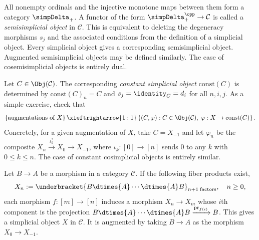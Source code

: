 \begin{remark}\label{rem:semisimplicial}
	All nonempty ordinals and the injective monotone maps between them form a
	category $\simpDelta_+$. A functor of the form
	$\simpDelta_+^{\opp}\to\mathcal{C}$ is called a \emph{semisimplicial
	object} in $\mathcal{C}$. This is equivalent to deleting the degeneracy
	morphisms $s_j$ and the associated conditions from the definition of a
	simplicial object. Every simplicial object gives a corresponding
	semisimplicial object. Augmented semisimplicial objects may be defined
	similarly. The case of cosemisimplicial objects is entirely dual.
\end{remark}

\begin{example}\label{eg:const-simplicial}
	Let $C\in\Obj(\mathcal{C})$. The corresponding \emph{constant simplicial
	object} $\mathrm{const}(C)$ is determined by
	$\mathrm{const}(C)_n=C$ and $s_j=\identity_C=d_i$ for all $n,i,j$. As a
	simple exercise, check that
	\[ \left\{ \text{augmentations of }X\right\} \xleftrightarrow{1:1} \left\{ (C, \varphi): C \in \Obj(\mathcal{C}), \; \varphi: X \to \mathrm{const}(C)  \right\}. \]
	Concretely, for a given augmentation of $X$, take $C=X_{-1}$ and let
	$\varphi_n$ be the composite
	$X_n\xrightarrow{\iota_k^*}X_0\to X_{-1}$, where
	$\iota_k:[0]\to[n]$ sends $0$ to any $k$ with
	$0\leq k\leq n$. The case of constant cosimplicial objects is entirely
	similar.
\end{example}

\begin{example}
	Let $B\to A$ be a morphism in a category $\mathcal{C}$. If the following
	fiber products exist,
	\[ X_n := \underbracket{B \dtimes{A} \cdots \dtimes{A} B}_{n+1 \;\text{factors}}, \quad n \geq 0, \]
	each morphism $f:[m]\to[n]$ induces a morphism $X_n\to X_m$ whose $i$th
	component is the projection
	$B\dtimes{A}\cdots\dtimes{A}B\xrightarrow{\mathrm{pr}_{f(i)}}B$. This
	gives a simplicial object $X$ in $\mathcal{C}$. It is augmented by taking
	$B\to A$ as the morphism $X_0\to X_{-1}$.
\end{example}

